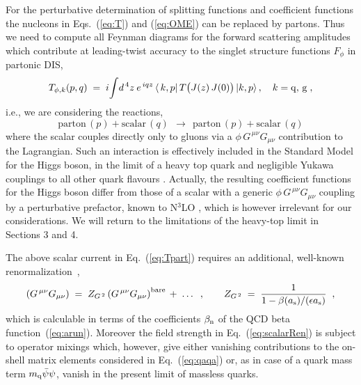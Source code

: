 \documentclass[12pt]{article}
\newcommand{\beq}{\begin{equation}}
\newcommand{\eeq}{\end{equation}}
\newcommand{\bea}{\begin{eqnarray}}
\newcommand{\eea}{\end{eqnarray}}
\newcommand{\ar}{a_{\rm s}}
\newcommand{\ep}{\epsilon}
\begin{document}
For the perturbative determination of splitting functions and coefficient 
functions the nucleons in Eqs.~(\ref{eq:T}) and (\ref{eq:OME}) can be replaced 
by partons. Thus we need to compute all Feynman diagrams for the forward 
scattering amplitudes which contribute at leading-twist accuracy to the singlet
structure functions $F_\phi$ in partonic DIS, 
%
\beq
\label{eq:Tpart}
  T_{\phi, k}(p,q) \; = \; i \! \int \! d^{\, 4}z \: e^{\,iqz} \, 
  \langle \, k, p \vert \, T \big(J(z) \, J(0) \big) \, \vert k, p \rangle 
  \, , \quad k = {\rm q,\,g} 
  \; , 
\eeq
%
i.e., we are considering the reactions,
%
\beq
\label{eq:qaqa}
 \mbox{parton}\,(p)+\mbox{scalar}\,(q) \:\:\rightarrow\:\:
 \mbox{parton}\,(p)+\mbox{scalar}\,(q) 
\end{equation}
%
where the scalar couples directly only to gluons via a $\phi\,G^{\,\mu\nu\!}
G_{\mu\nu}$ contribution to the Lagrangian. Such an interaction is effectively 
included in the Standard Model for the Higgs boson, in the limit of a heavy top
quark and negligible Yukawa couplings to all other quark flavours \cite{HGGeff}.
Actually, the resulting coefficient functions for the Higgs boson differ from 
those of a scalar with a generic $\phi\,G^{\,\mu\nu\!}G_{\mu\nu}$ coupling by a
perturbative prefactor, known to N$^3$LO \cite{Chetyrkin:1997un}, which is 
however irrelevant for our considerations. 
We will return to the limitations of the heavy-top limit in Sections 3 and 4.

The above scalar current in Eq.~(\ref{eq:Tpart}) requires an additional, 
well-known renormalization~\cite{GGrenorm},
%
\bea
\label{eq:scalarRen}
\left( G^{\,\mu\nu} G_{\mu\nu} \right) \;=\; 
 Z_{G^{\,2}} \left( G^{\,\mu\nu} G_{\mu\nu} \right)^{\rm{bare}} 
 \, +\; \dots \;\; , \qquad
 Z_{G^{\,2}} \;=\; \frac{1}{1-\beta(\ar)/(\ep \ar)} \;\; ,
\eea
%
which is calculable in terms of the coefficients $\beta_{\rm n}$ of the QCD 
beta function~(\ref{eq:arun}). Moreover the field strength in 
Eq.~(\ref{eq:scalarRen}) is subject to operator mixings which, however, give 
either vanishing contributions to the on-shell matrix elements considered in 
Eq.~(\ref{eq:qaqa}) or, as in case of a quark mass term 
$m_{\rm{q}}\bar{\psi} \psi$, vanish in the present limit of massless quarks.
\end{document}
